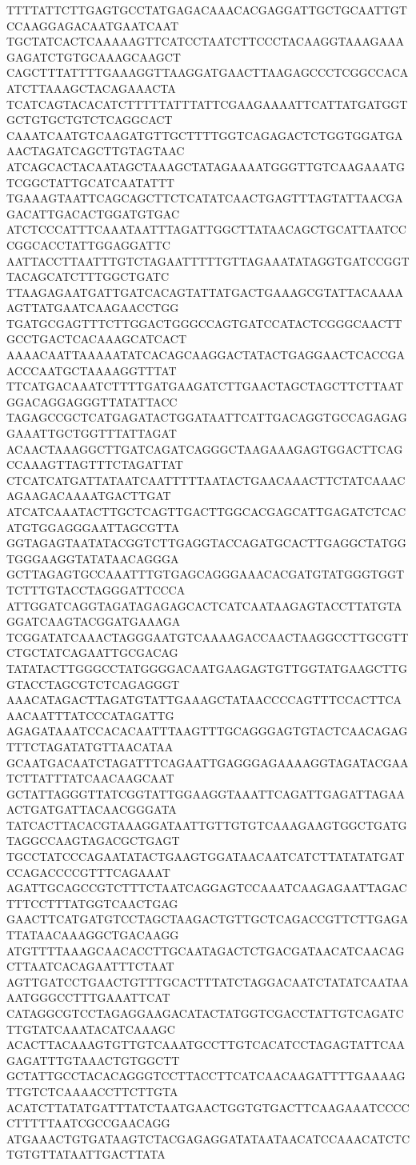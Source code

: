 TTTTATTCTTGAGTGCCTATGAGACAAACACGAGGATTGCTGCAATTGTCCAAGGAGACAATGAATCAAT
TGCTATCACTCAAAAAGTTCATCCTAATCTTCCCTACAAGGTAAAGAAAGAGATCTGTGCAAAGCAAGCT
CAGCTTTATTTTGAAAGGTTAAGGATGAACTTAAGAGCCCTCGGCCACAATCTTAAAGCTACAGAAACTA
TCATCAGTACACATCTTTTTATTTATTCGAAGAAAATTCATTATGATGGTGCTGTGCTGTCTCAGGCACT
CAAATCAATGTCAAGATGTTGCTTTTGGTCAGAGACTCTGGTGGATGAAACTAGATCAGCTTGTAGTAAC
ATCAGCACTACAATAGCTAAAGCTATAGAAAATGGGTTGTCAAGAAATGTCGGCTATTGCATCAATATTT
TGAAAGTAATTCAGCAGCTTCTCATATCAACTGAGTTTAGTATTAACGAGACATTGACACTGGATGTGAC
ATCTCCCATTTCAAATAATTTAGATTGGCTTATAACAGCTGCATTAATCCCGGCACCTATTGGAGGATTC
AATTACCTTAATTTGTCTAGAATTTTTGTTAGAAATATAGGTGATCCGGTTACAGCATCTTTGGCTGATC
TTAAGAGAATGATTGATCACAGTATTATGACTGAAAGCGTATTACAAAAAGTTATGAATCAAGAACCTGG
TGATGCGAGTTTCTTGGACTGGGCCAGTGATCCATACTCGGGCAACTTGCCTGACTCACAAAGCATCACT
AAAACAATTAAAAATATCACAGCAAGGACTATACTGAGGAACTCACCGAACCCAATGCTAAAAGGTTTAT
TTCATGACAAATCTTTTGATGAAGATCTTGAACTAGCTAGCTTCTTAATGGACAGGAGGGTTATATTACC
TAGAGCCGCTCATGAGATACTGGATAATTCATTGACAGGTGCCAGAGAGGAAATTGCTGGTTTATTAGAT
ACAACTAAAGGCTTGATCAGATCAGGGCTAAGAAAGAGTGGACTTCAGCCAAAGTTAGTTTCTAGATTAT
CTCATCATGATTATAATCAATTTTTAATACTGAACAAACTTCTATCAAACAGAAGACAAAATGACTTGAT
ATCATCAAATACTTGCTCAGTTGACTTGGCACGAGCATTGAGATCTCACATGTGGAGGGAATTAGCGTTA
GGTAGAGTAATATACGGTCTTGAGGTACCAGATGCACTTGAGGCTATGGTGGGAAGGTATATAACAGGGA
GCTTAGAGTGCCAAATTTGTGAGCAGGGAAACACGATGTATGGGTGGTTCTTTGTACCTAGGGATTCCCA
ATTGGATCAGGTAGATAGAGAGCACTCATCAATAAGAGTACCTTATGTAGGATCAAGTACGGATGAAAGA
TCGGATATCAAACTAGGGAATGTCAAAAGACCAACTAAGGCCTTGCGTTCTGCTATCAGAATTGCGACAG
TATATACTTGGGCCTATGGGGACAATGAAGAGTGTTGGTATGAAGCTTGGTACCTAGCGTCTCAGAGGGT
AAACATAGACTTAGATGTATTGAAAGCTATAACCCCAGTTTCCACTTCAAACAATTTATCCCATAGATTG
AGAGATAAATCCACACAATTTAAGTTTGCAGGGAGTGTACTCAACAGAGTTTCTAGATATGTTAACATAA
GCAATGACAATCTAGATTTCAGAATTGAGGGAGAAAAGGTAGATACGAATCTTATTTATCAACAAGCAAT
GCTATTAGGGTTATCGGTATTGGAAGGTAAATTCAGATTGAGATTAGAAACTGATGATTACAACGGGATA
TATCACTTACACGTAAAGGATAATTGTTGTGTCAAAGAAGTGGCTGATGTAGGCCAAGTAGACGCTGAGT
TGCCTATCCCAGAATATACTGAAGTGGATAACAATCATCTTATATATGATCCAGACCCCGTTTCAGAAAT
AGATTGCAGCCGTCTTTCTAATCAGGAGTCCAAATCAAGAGAATTAGACTTTCCTTTATGGTCAACTGAG
GAACTTCATGATGTCCTAGCTAAGACTGTTGCTCAGACCGTTCTTGAGATTATAACAAAGGCTGACAAGG
ATGTTTTAAAGCAACACCTTGCAATAGACTCTGACGATAACATCAACAGCTTAATCACAGAATTTCTAAT
AGTTGATCCTGAACTGTTTGCACTTTATCTAGGACAATCTATATCAATAAAATGGGCCTTTGAAATTCAT
CATAGGCGTCCTAGAGGAAGACATACTATGGTCGACCTATTGTCAGATCTTGTATCAAATACATCAAAGC
ACACTTACAAAGTGTTGTCAAATGCCTTGTCACATCCTAGAGTATTCAAGAGATTTGTAAACTGTGGCTT
GCTATTGCCTACACAGGGTCCTTACCTTCATCAACAAGATTTTGAAAAGTTGTCTCAAAACCTTCTTGTA
ACATCTTATATGATTTATCTAATGAACTGGTGTGACTTCAAGAAATCCCCCTTTTTAATCGCCGAACAGG
ATGAAACTGTGATAAGTCTACGAGAGGATATAATAACATCCAAACATCTCTGTGTTATAATTGACTTATA

